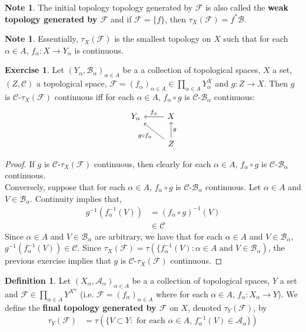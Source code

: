 \documentclass[12pt]{amsart}
\theoremstyle{definition}
\newtheorem{defn}[definition]{Definition}
\newtheorem{note}[definition]{Note}
\newtheorem{ex}[definition]{Exercise}
\newcommand{\al}{\alpha}
\newcommand{\MA}{\mathcal{A}}
\newcommand{\MC}{\mathcal{C}}
\newcommand{\MB}{\mathcal{B}}
\newcommand{\MF}{\mathcal{F}}
\newcommand{\tbf}[1]{\textbf{#1}}
\DeclareMathOperator*{\0}{\mbf{0}}
\DeclareMathOperator*{\1}{\mbf{1}}
\newcommand{\ld}[1]{\label{defn:#1}}
\begin{document}
	\begin{note}
	The initial topology topology generated by $\MF$ is also called the \tbf{weak topology generated by $\MF$} and if $\MF = \{f\}$, then $\tau_X(\MF) = f^*\MB$.
	\end{note}
	
	\begin{note}
	Essentially, $\tau_X(\MF)$ is the smallest topology on $X$ such that for each $\al \in A$, $f_{\al}:X \rightarrow Y_{\al}$ is continuous. 
	\end{note}

	\begin{ex}
		Let $(Y_{\al}, \MB_{\al})_{\al \in A}$ be a a collection of topological spaces, $X$ a set, $(Z, \MC)$ a topological space, $\MF = (f_{\al})_{\al \in A} \in \prod \limits_{\al \in A}Y_{\al}^X$ and $g: Z \rightarrow X$. Then $g$ is $\MC$-$\tau_X(\MF)$ continuous iff for each $\al \in A$, $f_{\al} \circ g$ is $\MC$-$\MB_{\al}$ continuous:
		\[ \begin{tikzcd}
			Y_{\al}	
			& X  \arrow[l, "f_{\al}"'] \\
			& Z \arrow[ul, "g \circ f_{\al}"]  \arrow[u, "g"']
		\end{tikzcd}
		\]
	\end{ex}
	
	\begin{proof}
		If $g$ is $\MC$-$\tau_X(\MF)$ continuous, then clearly for each $\al \in A$, $ f_{\al} \circ g$ is $\MC$-$\MB_{\al}$ continuous. \\
		Conversely, suppose that for each $\al \in A$, $f_{\al} \circ g$ is $\MC$-$\MB_{\al}$ continuous. Let $\al \in A$ and $V \in \MB_{\al}$. Continuity implies that,
		\begin{align*}
			g^{-1}(f_{\al}^{-1}(V)) 
			& = (f_{\al} \circ g)^{-1}(V) \\
			& \in \MC
		\end{align*}
		Since $\al \in A$ and $V \in \MB_{\al}$ are arbitrary, we have that for each $\al \in A$ and $V \in \MB_{\al}$, $g^{-1}(f_{\al}^{-1}(V)) \in \MC$. Since $\tau_X(\MF) = \tau(\{f_{\al}^{-1}(V): \al \in A \text{ and } V \in \MB_{\al})$, the previous exercise implies that $g$ is $\MC$-$\tau_X(\MF)$  continuous.
	\end{proof}
	
	\begin{defn} \ld{}
	Let $(X_{\al}, \MA_{\al})_{\al \in A}$ be a a collection of topological spaces, $Y$ a set and $\MF \in \prod \limits_{\al \in A}Y^{X^{\al}}$ (i.e. $\MF = (f_{\al})_{\al \in A}$ where for each $\al \in A$, $f_{\al}:X_{\al} \rightarrow Y$). We define the \tbf{final topology generated by $\MF$} on $X$, denoted $\tau_Y(\MF)$, by 
	\begin{align*}
	\tau_Y(\MF) 
	&= \tau(\{V \subset Y: \text{ for each $\al \in A$, $f_{\al}^{-1}(V) \in \MA_{\al}$}\})
\end{align*}	 
	\end{defn}
	
\end{document}

